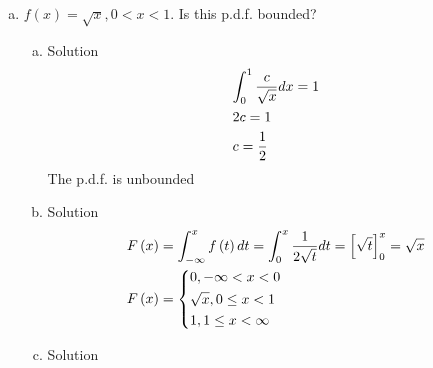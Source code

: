 \documentclass{article}
\begin{document}
\begin{spacing}{1.1}
\begin{homeworkProblem}
\begin{enumerate}[(a)]
\begin{enumerate}[(a)]
\begin{homeworkSection}{Solution}
					\end{homeworkSection}
			\end{enumerate}
		\item $f(x) = \sqrt x, 0 < x < 1$.  Is this p.d.f. bounded?
			\begin{enumerate}[(a)]
				\item
					\begin{homeworkSection}{Solution}
						\[\begin{gathered}
						  \int_0^1 {\frac{c}{{\sqrt x }}dx}  = 1 \hfill \\
						  2c = 1 \hfill \\
						  c = \frac{1}{2} \hfill \\ 
						\end{gathered} \]
						The p.d.f. is unbounded
					\end{homeworkSection}
				\item
					\begin{homeworkSection}{Solution}
						\[\begin{gathered}
						  F\left( x \right) = \int_{ - \infty }^x {f\left( t \right)dt}  = \int_0^x {\frac{1}{{2\sqrt t }}dt}  = \left[ {\sqrt t } \right]_0^x = \sqrt x  \hfill \\
						  F\left( x \right) = \left\{ \begin{gathered}
						  0, - \infty  < x < 0 \hfill \\
						  \sqrt x ,0 \le x < 1 \hfill \\
						  1,1 \le x < \infty  \hfill \\ 
						\end{gathered}  \right. \hfill \\ 
						\end{gathered} \]
					\end{homeworkSection}
				\item
					\begin{homeworkSection}{Solution}
		

\end{homeworkSection}
\end{enumerate}
\end{enumerate}
\end{homeworkProblem}
\end{spacing}
\end{document}

